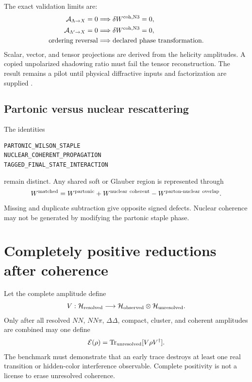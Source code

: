 \documentclass[11pt]{article}
\newcommand{\Tr}{\operatorname{Tr}}
\newcommand{\Hil}{\mathcal H}
\newcommand{\cE}{\mathcal E}
\begin{document}
The exact validation limits are:
\begin{align}
 \mathcal A_{\Lambda\to X}=0
 &\Longrightarrow
 \delta W^{\rm coh,N3}=0,\\
 \mathcal A_{\Lambda'\to X}=0
 &\Longrightarrow
 \delta W^{\rm coh,N3}=0,\\
 \text{ordering reversal}
 &\Longrightarrow
 \text{declared phase transformation}.
\label{eq:n3-coherent-limits}
\end{align}
Scalar, vector, and tensor projections are derived from the helicity amplitudes.  A copied unpolarized shadowing ratio must fail the tensor reconstruction.  The result remains a pilot until physical diffractive inputs and factorization are supplied \cite{FrankfurtGuzeyStrikman2012}.

\subsection{Partonic versus nuclear rescattering}

The identities
\begin{verbatim}
PARTONIC_WILSON_STAPLE
NUCLEAR_COHERENT_PROPAGATION
TAGGED_FINAL_STATE_INTERACTION
\end{verbatim}
remain distinct.  Any shared soft or Glauber region is represented through
\begin{equation}
 W^{\rm matched}
 =W^{\rm partonic}
 +W^{\rm nuclear\ coherent}
 -W^{\rm parton\text{-}nuclear\ overlap}.
\label{eq:n3-parton-nuclear-subtraction}
\end{equation}
Missing and duplicate subtraction give opposite signed defects.  Nuclear coherence may not be generated by modifying the partonic staple phase.

\section{Completely positive reductions after coherence}
\label{sec:cp}

Let the complete amplitude define
\begin{equation}
 V:\Hil_{\rm resolved}
 \longrightarrow
 \Hil_{\rm observed}\otimes\Hil_{\rm unresolved}.
\label{eq:n3-amplitude-embedding}
\end{equation}
Only after all resolved \(NN\), \(NN\pi\), \(\Delta\Delta\), compact, cluster, and coherent amplitudes are combined may one define
\begin{equation}
 \cE(\rho)
 =\Tr_{\rm unresolved}[V\rho V^\dagger].
\label{eq:n3-cp-map}
\end{equation}
The benchmark must demonstrate that an early trace destroys at least one real transition or hidden-color interference observable.  Complete positivity is not a license to erase unresolved coherence.
\end{document}
